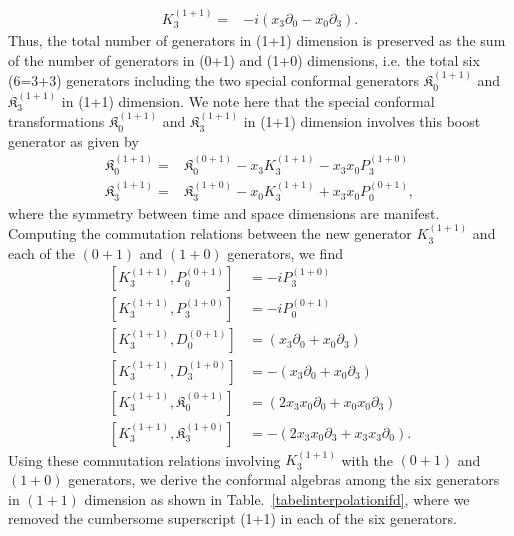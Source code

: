 \documentclass[%
 reprint,
superscriptaddress,
 amsmath,amssymb,
 aps,
]{revtex4-2}
\begin{document}
\begin{align}
K_{3}^{(1+1)}=&-i(x_{3}\partial_{0}-x_{0}\partial_{3}).
\end{align}
Thus, the total number of generators in (1+1) dimension is preserved as the sum of the number of generators in (0+1) and (1+0) dimensions, i.e. the total six (6=3+3) generators including the two special conformal generators $\mathfrak{K}^{(1+1)}_{{0}}$ and $\mathfrak{K}^{(1+1)}_{{3}}$ in (1+1) dimension. We note here that 
the special conformal transformations $\mathfrak{K}^{(1+1)}_{{0}}$
and $\mathfrak{K}^{(1+1)}_{{3}}$ in (1+1) dimension involves this boost generator as given by
\begin{align}
\mathfrak{K}^{(1+1)}_{{0}}=&\mathfrak{K}^{(0+1)}_{{0}}-x_{3}K_{3}^{(1+1)}-x_{3}x_{0}P^{(1+0)}_{3}\\
\mathfrak{K}^{(1+1)}_{{3}}=&\mathfrak{K}^{(1+0)}_{{3}}-x_{0}K_{3}^{(1+1)}+x_{3}x_{0}P^{(0+1)}_{0},
\end{align}
where the symmetry between time and space 
dimensions are manifest.
Computing the commutation relations between the new generator $K_{3}^{(1+1)}$ and each of the $(0+1)$ and $(1+0)$ generators, we find
\begin{align}
    \left[K_{3}^{(1+1)}, P^{(0+1)}_{0}\right] &= -iP^{(1+0)}_{3}\\
    \left[K_{3}^{(1+1)}, P^{(1+0)}_{3}\right] &= -iP^{(0+1)}_{0}\\
    \left[K_{3}^{(1+1)}, D^{(0+1)}_{0}\right] &=(x_{3}\partial_{0}+x_{0}\partial_{3})\\
    \left[K_{3}^{(1+1)}, D^{(1+0)}_{3}\right] &=-(x_{3}\partial_{0}+x_{0}\partial_{3})\\
    \left[K_{3}^{(1+1)}, \mathfrak{K}^{(0+1)}_{0}\right] &=(2x_{3}x_{0}\partial_{0}+x_{0}x_{0}\partial_{3})\\
    \left[K_{3}^{(1+1)}, \mathfrak{K}^{(1+0)}_{3}\right] &=-(2x_{3}x_{0}\partial_{3}+x_{3}x_{3}\partial_{0}).
\end{align}
Using these commutation relations involving $K_{3}^{(1+1)}$ with the $(0+1)$ and $(1+0)$ generators, we derive the conformal algebras among the six generators in $(1+1)$ dimension as shown in Table.~\ref{tabelinterpolationifd}, where we removed the cumbersome superscript (1+1) in each of the six generators. 
\end{document}
